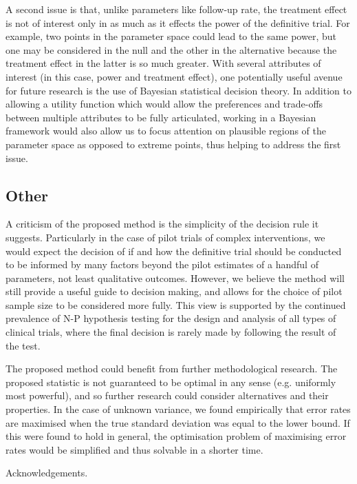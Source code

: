 \documentclass[AMA,STIX1COL]{WileyNJD-v2}
\begin{document}
A second issue is that, unlike parameters like follow-up rate, the treatment effect is not of interest only in as much as it effects the power of the definitive trial. For example, two points in the parameter space could lead to the same power, but one may be considered in the null and the other in the alternative because the treatment effect in the latter is so much greater. With several attributes of interest (in this case, power and treatment effect), one potentially useful avenue for future research is the use of Bayesian statistical decision theory. In addition to allowing a utility function which would allow the preferences and trade-offs between multiple attributes to be fully articulated, working in a Bayesian framework would also allow us to focus attention on plausible regions of the parameter space as opposed to extreme points, thus helping to address the first issue.

\subsection{Other}

A criticism of the proposed method is the simplicity of the decision rule it suggests. Particularly in the case of pilot trials of complex interventions, we would expect the decision of if and how the definitive trial should be conducted to be informed by many factors beyond the pilot estimates of a handful of parameters, not least qualitative outcomes. However, we believe the method will still provide a useful guide to decision making, and allows for the choice of pilot sample size to be considered more fully. This view is supported by the continued prevalence of N-P hypothesis testing for the design and analysis of all types of clinical trials, where the final decision is rarely made by following the result of the test.

The proposed method could benefit from further methodological research. The proposed statistic is not guaranteed to be optimal in any sense (e.g. uniformly most powerful), and so further research could consider alternatives and their properties. In the case of unknown variance, we found empirically that error rates are maximised when the true standard deviation was equal to the lower bound. If this were found to hold in general, the optimisation problem of maximising error rates would be simplified and thus solvable in a shorter time.

\ack
Acknowledgements.

%

\end{document}
